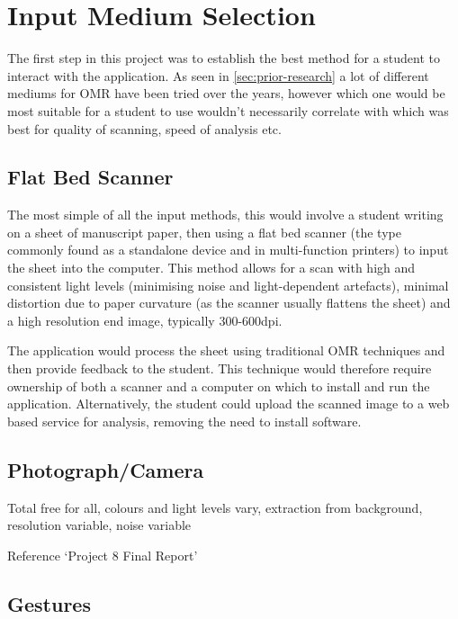 \section{Input Medium Selection}
\label{sec:medium-selection}

The first step in this project was to establish the best method for a student to interact with the application. As seen in \cref{sec:prior-research} a lot of different mediums for OMR have been tried over the years, however which one would be most suitable for a student to use wouldn't necessarily correlate with which was best for quality of scanning, speed of analysis etc.

\subsection{Flat Bed Scanner}

The most simple of all the input methods, this would involve a student writing on a sheet of manuscript paper, then using a flat bed scanner (the type commonly found as a standalone device and in multi-function printers) to input the sheet into the computer. This method allows for a scan with high and consistent light levels (minimising noise and light-dependent artefacts), minimal distortion due to paper curvature (as the scanner usually flattens the sheet) and a high resolution end image, typically 300-600dpi.

The application would process the sheet using traditional OMR techniques and then provide feedback to the student. This technique would therefore require ownership of both a scanner and a computer on which to install and run the application. Alternatively, the student could upload the scanned image to a web based service for analysis, removing the need to install software.

\subsection{Photograph/Camera}


Total free for all, colours and light levels vary, extraction from background, resolution variable, noise variable

Reference `Project 8 Final Report'

\subsection{Gestures}

